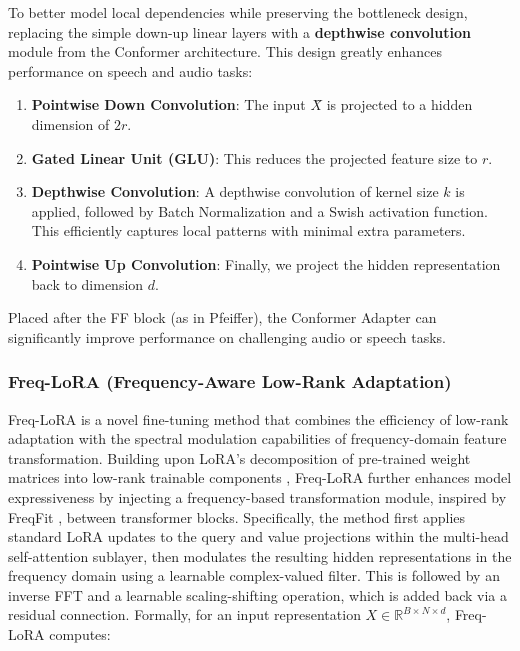\documentclass[11pt]{article}
\begin{document}
To better model local dependencies while preserving the bottleneck design, replacing the simple down-up linear layers with a \textbf{depthwise convolution} module from the Conformer architecture. This design greatly enhances performance on speech and audio tasks:

\begin{enumerate}
    \item \textbf{Pointwise Down Convolution}: The input $X̂$ is projected to a hidden dimension of $2r$. 
    \item \textbf{Gated Linear Unit (GLU)}: This reduces the projected feature size to $r$.
    \item \textbf{Depthwise Convolution}: A depthwise convolution of kernel size $k$ is applied, followed by Batch Normalization and a Swish activation function. This efficiently captures local patterns with minimal extra parameters.
    \item \textbf{Pointwise Up Convolution}: Finally, we project the hidden representation back to dimension $d$.
\end{enumerate}

Placed after the FF block (as in Pfeiffer), the Conformer Adapter can significantly improve performance on challenging audio or speech tasks.

\subsubsection{Freq-LoRA (Frequency-Aware Low-Rank Adaptation)}

Freq-LoRA is a novel fine-tuning method that combines the efficiency of low-rank adaptation with the spectral modulation capabilities of frequency-domain feature transformation. Building upon LoRA's decomposition of pre-trained weight matrices into low-rank trainable components \cite{hu2021lora}, Freq-LoRA further enhances model expressiveness by injecting a frequency-based transformation module, inspired by FreqFit \cite{ly2024enhancing}, between transformer blocks. Specifically, the method first applies standard LoRA updates to the query and value projections within the multi-head self-attention sublayer, then modulates the resulting hidden representations in the frequency domain using a learnable complex-valued filter. This is followed by an inverse FFT and a learnable scaling-shifting operation, which is added back via a residual connection. Formally, for an input representation $X \in \mathbb{R}^{B \times N \times d}$, Freq-LoRA computes:
\end{document}
